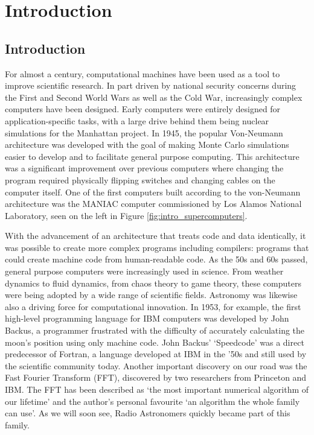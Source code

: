 \chapter{Introduction}


\section{Introduction}\label{sec:intro_intro}

For almost a century, computational machines have been used as a tool to improve scientific research. In part driven by national security concerns during the First and Second World Wars as well as the Cold War, increasingly complex computers have been designed. Early computers were entirely designed for application-specific tasks, with a large drive behind them being nuclear simulations for the Manhattan project. In 1945, the popular Von-Neumann architecture was developed with the goal of making Monte Carlo simulations easier to develop and to facilitate general purpose computing. This architecture was a significant improvement over previous computers where changing the program required physically flipping switches and changing cables on the computer itself. One of the first computers built according to the von-Neumann architecture was the MANIAC computer commissioned by Los Alamos National Laboratory, seen on the left in Figure \ref{fig:intro_supercomputers}.

With the advancement of an architecture that treats code and data identically, it was possible to create more complex programs including compilers: programs that could create machine code from human-readable code. As the 50s and 60s passed, general purpose computers were increasingly used in science. From weather dynamics to fluid dynamics, from chaos theory to game theory, these computers were being adopted by a wide range of scientific fields. Astronomy was likewise also a driving force for computational innovation. In 1953, for example, the first high-level programming language for IBM computers was developed by John Backus, a programmer frustrated with the difficulty of accurately calculating the moon's position using only machine code. John Backus' `Speedcode' was a direct predecessor of Fortran, a language developed at IBM in the '50s and still used by the scientific community today. Another important discovery on our road was the Fast Fourier Transform (FFT), discovered by two researchers from Princeton and IBM. The FFT has been described as `the most important numerical algorithm of our lifetime' and the author's personal favourite `an algorithm the whole family can use'\citep{top_10_algos}. As we will soon see, Radio Astronomers quickly became part of this family.

